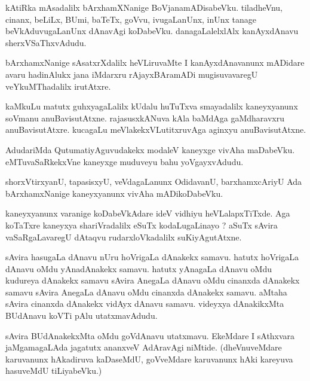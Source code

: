 \documentclass{article}
\begin{document}
\begin{mn}%
kAtiRka mAsadalilx bArxhamXNanige BoVjanamADisabeVku. tiladheVnu, cinanx, beLiLx, BUmi, baTeTx, 
goVvu, ivugaLanUnx, inUnx tanage beVkAduvugaLanUnx dAnavAgi koDabeVku. danagaLalelxlAlx 
kanAyxdAnavu sherxVSaThxvAdudu.
\end{mn}

\begin{mn}%
bArxhamxNanige sAsatxrXdalilx heVLiruvaMte I kanAyxdAnavanunx mADidare avaru hadinAlukx jana 
iMdarxru rAjayxBAramADi mugisuvavaregU veYkuMThadalilx irutAtxre.
\end{mn}

\begin{mn}%
kaMkuLu matutx guhxyagaLalilx kUdalu huTuTxva smayadalilx kaneyxyanunx soVmanu anuBavisutAtxne. 
rajasusxkANuva kAla baMdAga gaMdharavxru anuBavisutAtxre. kucagaLu meVlakekxVLutitxruvAga aginxyu 
anuBavisutAtxne.
\end{mn}

\begin{mn}%
AdudariMda QutumatiyAguvudakekx modaleV kaneyxge vivAha maDabeVku. eMTuvaSaRkekxVne kaneyxge 
muduveyu bahu yoVgayxvAdudu.
\end{mn}

\begin{mn}%
shorxVtirxyanU, tapasisxyU, veVdagaLanunx OdidavanU, barxhamxcAriyU Ada bArxhamxNanige 
kaneyxyanunx vivAha mADikoDabeVku.
\end{mn}

\begin{mn}%
kaneyxyanunx varanige koDabeVkAdare ideV vidhiyu heVLalapxTiTxde. Aga koTaTxre kaneyxya 
shariVradalilx eSuTx kodaLugaLinayo ? aSuTx sAvira vaSaRgaLavaregU dAtaqvu rudarxloVkadalilx 
suKiyAgutAtxne.
\end{mn}

\begin{mn}%
sAvira hasugaLa dAnavu nUru hoVrigaLa dAnakekx samavu. hatutx hoVrigaLa dAnavu oMdu yAnadAnakekx 
samavu. hatutx yAnagaLa dAnavu oMdu kudureya dAnakekx samavu sAvira AnegaLa dAnavu oMdu cinanxda 
dAnakekx samavu sAvira AnegaLa dAnavu oMdu cinanxda dAnakekx samavu. aMtaha sAvira cinanxda 
dAnakekx vidAyx dAnavu samavu. videyxya dAnakikxMta BUdAnavu koVTi pAlu utatxmavAdudu.
\end{mn}

\begin{mn}%
sAvira BUdAnakekxMta oMdu goVdAnavu utatxmavu. EkeMdare I sAthxvara jaMgamagaLAda jagatutx 
ananxveV AdAravAgi niMtide. (dheVnuveMdare karuvanunx hAkadiruva kaDaseMdU, goVveMdare karuvanunx 
hAki kareyuva hasuveMdU tiLiyabeVku.) 
\end{mn}
\end{document}
